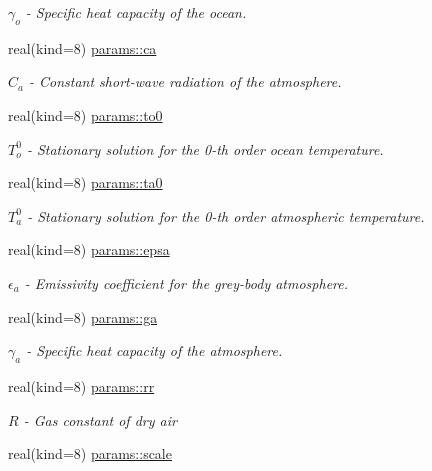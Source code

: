 \begin{DoxyCompactItemize}
\begin{DoxyCompactList}\small\item\em $\gamma_o$ -\/ Specific heat capacity of the ocean. \end{DoxyCompactList}\item 
real(kind=8) \hyperlink{namespaceparams_a39788da6872d45cd235d734a6f60ac20}{params\+::ca}
\begin{DoxyCompactList}\small\item\em $C_a$ -\/ Constant short-\/wave radiation of the atmosphere. \end{DoxyCompactList}\item 
real(kind=8) \hyperlink{namespaceparams_ad880ab6d5fab6c7a095b526383e75404}{params\+::to0}
\begin{DoxyCompactList}\small\item\em $T_o^0$ -\/ Stationary solution for the 0-\/th order ocean temperature. \end{DoxyCompactList}\item 
real(kind=8) \hyperlink{namespaceparams_af3fdd8c130a667bca95de5ebf9e5f492}{params\+::ta0}
\begin{DoxyCompactList}\small\item\em $T_a^0$ -\/ Stationary solution for the 0-\/th order atmospheric temperature. \end{DoxyCompactList}\item 
real(kind=8) \hyperlink{namespaceparams_a10c96506a7d395bb9b15734461aef879}{params\+::epsa}
\begin{DoxyCompactList}\small\item\em $\epsilon_a$ -\/ Emissivity coefficient for the grey-\/body atmosphere. \end{DoxyCompactList}\item 
real(kind=8) \hyperlink{namespaceparams_a1c769c8719a62f1a72837b7b9daf8024}{params\+::ga}
\begin{DoxyCompactList}\small\item\em $\gamma_a$ -\/ Specific heat capacity of the atmosphere. \end{DoxyCompactList}\item 
real(kind=8) \hyperlink{namespaceparams_ac1c1ed1ab5fcbdbd6a77b8a5c69fc6e5}{params\+::rr}
\begin{DoxyCompactList}\small\item\em $R$ -\/ Gas constant of dry air \end{DoxyCompactList}\item 
real(kind=8) \hyperlink{namespaceparams_a7803126847c2e1b2b4aced941ec9257b}{params\+::scale}

\end{DoxyCompactItemize}
